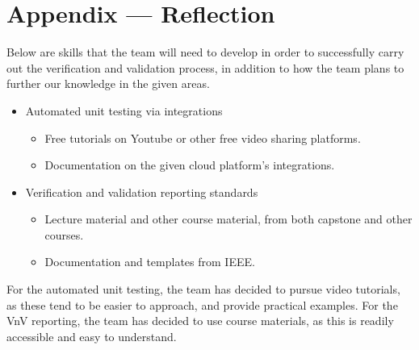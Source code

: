 \documentclass[12pt, titlepage]{article}
\begin{document}
\newpage{}
\section*{Appendix --- Reflection}

Below are skills that the team will need to develop in order to successfully carry out the verification and validation process, in addition to how the team plans to further our knowledge in the given areas.

\begin{itemize}
\item Automated unit testing via integrations
\begin{itemize}
\item Free tutorials on Youtube or other free video sharing platforms.
\item Documentation on the given cloud platform's integrations.
\end{itemize}
\item Verification and validation reporting standards
\begin{itemize}
\item Lecture material and other course material, from both capstone and other courses.
\item Documentation and templates from IEEE.
\end{itemize}
\end{itemize}
For the automated unit testing, the team has decided to pursue video tutorials, as these tend to be easier to approach, and provide practical examples. For the VnV reporting, the team has decided to use course materials, as this is readily accessible and easy to understand.
\end{document}
